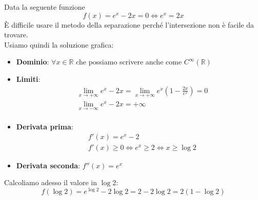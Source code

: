 \begin{example}
	Data la seguente funzione
	\begin{equation*}
		f(x) = e^x - 2x = 0 \Leftrightarrow e^x = 2x
	\end{equation*}
	È difficile usare il metodo della separazione perché l'intersezione non è facile da trovare. \\
	Usiamo quindi la soluzione grafica:
	\begin{itemize}
		\item \textbf{Dominio}: $\forall x \in \mathbb{R}$ che possiamo scrivere anche come $C^\infty (\mathbb{R})$
		\item \textbf{Limiti}:
		\begin{align*}
			& \lim_{x \to + \infty} e^x -2x = \lim_{x \to + \infty} e^x (1 - \frac{2x}{e^x}) = 0\\
			& \lim_{x \to - \infty} e^x -2x = + \infty\\
		\end{align*}
		\item \textbf{Derivata prima}: \begin{align*}
			& f'(x) = e^x -2 \\
			& f'(x) \geq 0 \Leftrightarrow e^x \geq 2 \Leftrightarrow x \geq \log 2
		\end{align*}
		\item \textbf{Derivata seconda}: $f''(x)=e^x$
	\end{itemize}
	\begin{center}
	\end{center}	
	Calcoliamo adesso il valore in $\log 2$:
	\begin{equation*}
		f(\log 2) = e^{\log 2} - 2 \log 2 = 2-2 \log 2 = 2 (1-\log 2)
	\end{equation*}
\end{example}

